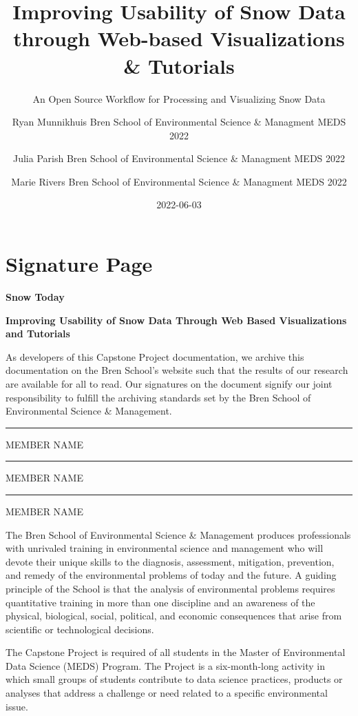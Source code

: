 \documentclass[
]{book}
\title{Improving Usability of Snow Data through Web-based Visualizations \& Tutorials}
\subtitle{An Open Source Workflow for Processing and Visualizing Snow Data}
\author{Ryan Munnikhuis \textbar{} Bren School of Environmental Science \& Managment \textbar{} MEDS 2022 \and Julia Parish \textbar{} Bren School of Environmental Science \& Managment \textbar{} MEDS 2022 \and Marie Rivers \textbar{} Bren School of Environmental Science \& Managment \textbar{} MEDS 2022}
\date{2022-06-03}
\begin{document}
\maketitle

{
\setcounter{tocdepth}{1}
\tableofcontents
}
\hypertarget{signature-page}{%
\chapter{Signature Page}\label{signature-page}}

\textbf{Snow Today}

\textbf{Improving Usability of Snow Data Through Web Based Visualizations and Tutorials}

As developers of this Capstone Project documentation, we archive this documentation on the Bren School's website such that the results of our research are available for all to read. Our signatures on the document signify our joint responsibility to fulfill the archiving standards set by the Bren School of Environmental Science \& Management.

\begin{center}\rule{0.5\linewidth}{0.5pt}\end{center}

MEMBER NAME

\begin{center}\rule{0.5\linewidth}{0.5pt}\end{center}

MEMBER NAME

\begin{center}\rule{0.5\linewidth}{0.5pt}\end{center}

MEMBER NAME

The Bren School of Environmental Science \& Management produces professionals with unrivaled training in environmental science and management who will devote their unique skills to the diagnosis, assessment, mitigation, prevention, and remedy of the environmental problems of today and the future. A guiding principle of the School is that the analysis of environmental problems requires quantitative training in more than one discipline and an awareness of the physical, biological, social, political, and economic consequences that arise from scientific or technological decisions.

The Capstone Project is required of all students in the Master of Environmental Data Science (MEDS) Program. The Project is a six-month-long activity in which small groups of students contribute to data science practices, products or analyses that address a challenge or need related to a specific environmental issue.
\end{document}

